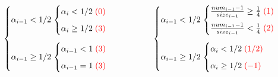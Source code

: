 \begin{frame}{}
  \begin{columns}
      \centerline{\large \textsc{}}

      \[
	\left.
	\begin{cases}
	  \alpha_{i-1} < 1/2 \left.
	  \begin{cases}
	    \alpha_{i} < 1/2 \; \textcolor{red}{(0)}\\[6pt]
	    \alpha_{i} \ge 1/2 \; \textcolor{red}{(3)}
	  \end{cases} \right.
	  \\[20pt]
	  \alpha_{i-1} \ge 1/2 \left.
	    \begin{cases}
	      \alpha_{i-1} < 1 \; \textcolor{red}{(3)} \\[6pt] 
	      \alpha_{i-1} = 1 \; \textcolor{red}{(3)}
	    \end{cases} \right.
	\end{cases} \right.
      \]
      \centerline{\large \textsc{}}

      \[
	\left.
	\begin{cases}
	  \alpha_{i-1} < 1/2 \left.
	    \begin{cases}
	      \frac{num_{i-1} - 1}{size_{i-1}} \ge \frac{1}{4} \; \textcolor{red}{(1)} \\[6pt]
	      \frac{num_{i-1} - 1}{size_{i-1}} < \frac{1}{4} \; \textcolor{red}{(2)}
	    \end{cases} \right.
	  \\[20pt]
	  \alpha_{i-1} \ge 1/2 \left.
	  \begin{cases}
	    \alpha_{i} < 1/2 \; \textcolor{red}{(1/2)} \\[6pt]
	    \alpha_{i} \ge 1/2 \; \textcolor{red}{(-1)}
	  \end{cases} \right.
	\end{cases} \right.
      \]
  \end{columns}

\end{frame}
